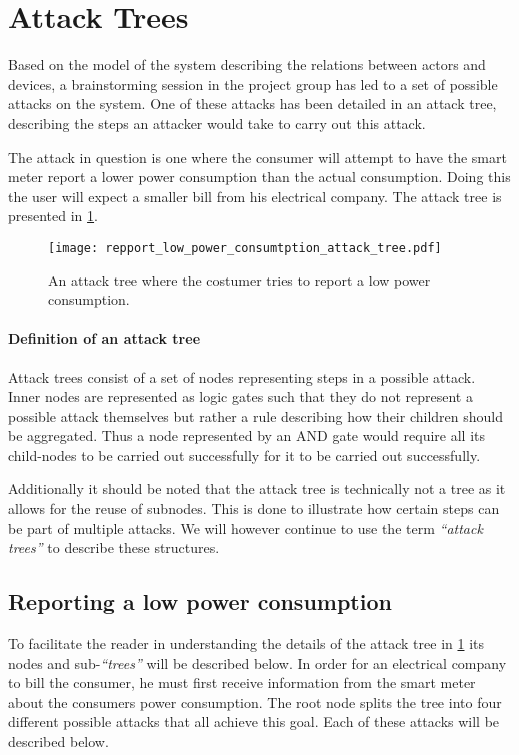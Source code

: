 \section{Attack Trees}
Based on the model of the system describing the relations between actors and devices, a brainstorming session in the project group has led to a set of possible attacks on the system.
One of these attacks has been detailed in an attack tree, describing the steps an attacker would take to carry out this attack.

The attack in question is one where the consumer will attempt to have the smart meter report a lower power consumption than the actual consumption.
Doing this the user will expect a smaller bill from his electrical company.
The attack tree is presented in \cref{report_power_attack_tree}.

\begin{figure}
  \texttt{[image: repport\_low\_power\_consumtption\_attack\_tree.pdf]}
  \caption{An attack tree where the costumer tries to report a low power consumption.}
  \label{report_power_attack_tree}
\end{figure}

\paragraph{Definition of an attack tree}
Attack trees consist of a set of nodes representing steps in a possible attack.
Inner nodes are represented as logic gates such that they do not represent a possible attack themselves but rather a rule describing how their children should be aggregated.
Thus a node represented by an AND gate would require all its child-nodes to be carried out successfully for it to be carried out successfully.

Additionally it should be noted that the attack tree is technically not a tree as it allows for the reuse of subnodes.
This is done to illustrate how certain steps can be part of multiple attacks.
We will however continue to use the term \emph{``attack trees''} to describe these structures.

\subsection{Reporting a low power consumption}
To facilitate the reader in understanding the details of the attack tree in \cref{report_power_attack_tree} its nodes and sub-\emph{``trees''} will be described below.
In order for an electrical company to bill the consumer, he must first receive information from the smart meter about the consumers power consumption.
The root node splits the tree into four different possible attacks that all achieve this goal.
Each of these attacks will be described below.

